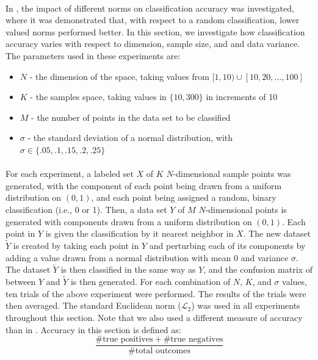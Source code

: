 \documentclass{article}
\begin{document}
\paragraph{}
In \cite{aggarwal2001surprising}, the impact of different norms on classification accuracy was investigated, where it was demonstrated that, with respect to a random classification, lower valued norms performed better. In this section, we investigate how classification accuracy varies with respect to dimension, sample size, and and data variance. The parameters used in these experiments are:
\begin{itemize}
\item $N$ - the dimension of the space, taking values from $[1,10)\cup[10,20,\ldots,100]$
\item $K$ - the samples space, taking values in $\{10,300\}$ in increments of 10
\item $M$ - the number of points in the data set to be classified
\item $\sigma$ - the standard deviation of a normal distribution, with $\sigma\in\{.05,.1,.15,.2,.25\}$
\end{itemize}
\paragraph{}
For each experiment, a labeled set $X$ of $K$ $N$-dimensional sample points was generated, with the component of each point being drawn from a uniform distribution on $(0,1)$, and each point being assigned a random, binary classification (i.e., 0 or 1). Then, a data set $Y$ of $M$ $N$-dimensional points is generated with components drawn  from a uniform distribution on $(0,1)$. Each point in $Y$ is given the classification by it nearest neighbor in $X$. The new dataset $\tilde{Y}$ is created by taking each point in $Y$ and perturbing each of its components by adding a value drawn from a normal distribution with mean $0$ and variance $\sigma$. The dataset $\tilde{Y}$ is then classified in the same way as $Y$, and the confusion matrix of between $Y$ and $\tilde{Y}$ is then generated.
For each combination of $N$, $K$, and $\sigma$ values, ten trials of the above experiment were performed. The results of the trials were then averaged. The standard Euclidean norm ($\mathcal{L}_2$) was used in all experiments throughout this section. Note that we also used a different measure of accuracy than in \cite{aggarwal2001surprising}. Accuracy in this section is defined as:
$$
	\dfrac{\#\textrm{true positives}+\#\textrm{true negatives}}{\#\textrm{total outcomes}}
$$
\end{document}
